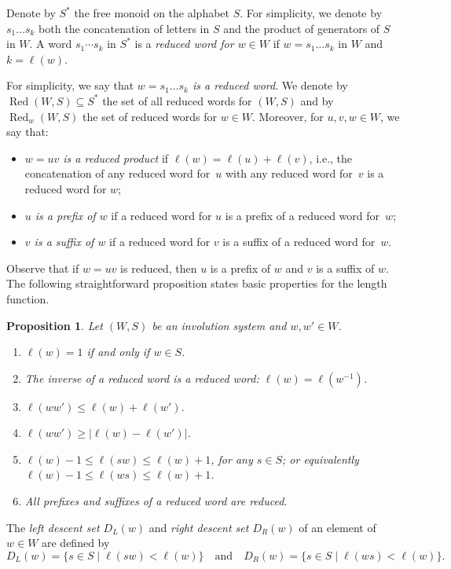 \documentclass[A4paper, oneside]{amsart}
\newcommand{\Red}{\operatorname{Red}}
\newtheorem{prop}[thm]{Proposition}
\theoremstyle{definition}
\begin{document}
Denote by $S^*$ the free monoid on the alphabet $S$. For simplicity, we denote by  $s_1\dots s_k$ both the concatenation of letters in $S$ and the product of generators of $S$ in $W$.  A word $s_1\cdots s_k$ in $S^*$ is a {\em reduced word for $w\in W$} if   $w=s_1\dots s_k$ in $W$ and $k=\ell(w)$. 

For simplicity, we say that {\em $w=s_1\dots s_k$ is a reduced word}. We denote by $\Red(W,S)\subseteq S^*$ the set of all reduced words for $(W,S)$ and by $\Red_w(W,S)$ the set of reduced words for $w\in W$. Moreover, for $u,v,w\in W$, we say that: 
\begin{itemize}[leftmargin=\parindent]
\item {\em $w=uv$ is a reduced product} if $\ell(w)=\ell(u)+\ell(v)$, i.e., the concatenation of any reduced word for~$u$ with any reduced word for~$v$ is a reduced word for $w$; 
\item {\em $u$ is a prefix of $w$} if a reduced word for $u$ is a prefix of a reduced word for~$w$;
\item {\em $v$ is a suffix of $w$} if a reduced word for $v$ is a suffix of a reduced word for~$w$.
\end{itemize}
Observe that if $w=uv$ is reduced, then  $u$ is a prefix of $w$ and $v$ is a suffix of $w$.  The following straightforward proposition states basic properties for the length function.

\begin{prop}\label{prop:Length} Let $(W,S)$ be an involution system and $w,w' \in W$. 
\begin{enumerate}
\item $\ell(w)=1$ if and only if $w \in S$.
\item The inverse of a reduced word is a reduced word: $\ell(w)=\ell(w^{-1})$.
\item $\ell(ww') \leq \ell(w)+\ell(w')$.
\item $\ell(ww') \geq |\ell(w)-\ell(w')|$.
\item $\ell(w)-1 \leq \ell(sw) \leq \ell(w)+1$, for any $s\in S$; or equivalently $\ell(w)-1 \leq \ell(ws) \leq \ell(w)+1$.            
\item All prefixes and suffixes of a reduced word are reduced.
\end{enumerate}
\end{prop}

The {\em left descent set $D_L(w)$} and {\em right descent set $D_R(w)$} of an element of $w\in W$ are defined by
\begin{equation}
\label{eq:Descents}
D_L(w)=\{s \in S\mid \ell(sw)<\ell(w)\}\quad \text{and}\quad D_R(w)=\{s \in S\mid \ell(ws)<\ell(w)\}.
\end{equation}
\end{document}

